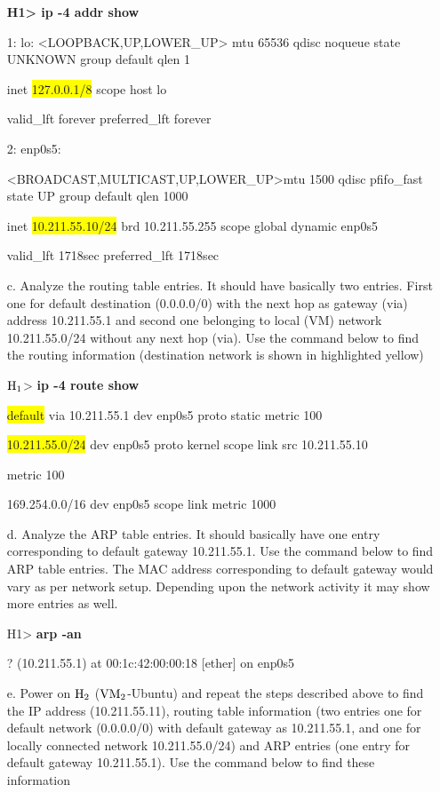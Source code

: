 \begin{multicols}{2}
\begin{itemize}
	\textbf{H1> ip -4 addr show}

	1: lo: <LOOPBACK,UP,LOWER\_UP> mtu 65536 qdisc noqueue state UNKNOWN group default qlen 1

	inet \colorbox{yellow}{127.0.0.1/8} scope host lo

	valid\_lft forever preferred\_lft forever

	2: enp0s5: 
	
	<BROADCAST,MULTICAST,UP,LOWER\_UP>\break mtu 1500 qdisc pfifo\_fast state UP group default qlen 1000

	inet \colorbox{yellow}{10.211.55.10/24} brd 10.211.55.255 scope global dynamic enp0s5

	valid\_lft 1718sec preferred\_lft 1718sec


\item[c.] Analyze the routing table entries. It should have basically two entries. First one for default destination (0.0.0.0/0) with the next hop as gateway (via) address 10.211.55.1 and second one belonging to local (VM) network 10.211.55.0/24 without any next hop (via). Use the command below to find the routing information (destination network is shown in highlighted yellow)

	${\rm H}_{1}$> \textbf{ip -4 route show}

	\colorbox{yellow}{default} via 10.211.55.1 dev enp0s5 proto static  metric 100

	\colorbox{yellow}{10.211.55.0/24} dev enp0s5 proto kernel scope link src 10.211.55.10

	metric 100

	169.254.0.0/16 dev enp0s5 scope link  metric 1000

\item[d.] Analyze the ARP table entries. It should basically have one entry corresponding to default gateway 10.211.55.1. Use the command below to find ARP table entries. The MAC address corresponding to default gateway would vary as per network setup. Depending upon the network activity it may show more entries as well.

	H1> \textbf{arp -an}

	? (10.211.55.1) at 00:1c:42:00:00:18 [ether] on enp0s5

\item[e.]  Power on ${\rm H}_{2}$ (${\rm VM}_{2}$-Ubuntu) and repeat the steps described above to find the IP address (10.211.55.11), routing table information (two entries one for default network (0.0.0.0/0) with default gateway as 10.211.55.1, and one for locally connected network 10.211.55.0/24) and ARP entries (one entry for default gateway 10.211.55.1). Use the command below to find these information


\end{itemize}
\end{multicols}
